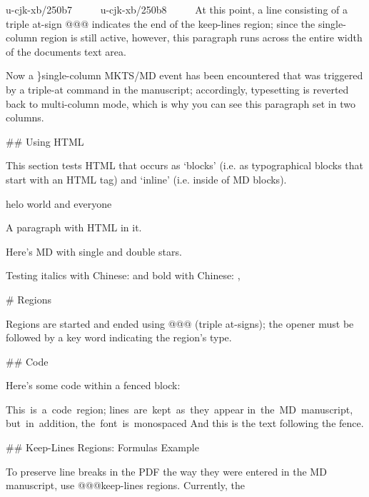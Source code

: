 {\mktsStyleCode{}u-cjk-xb/250b7}     
{\mktsStyleCode{}u-cjk-xb/250b8}     
\endgroup{}At this point, a line consisting of a triple at-sign {\mktsStyleCode{}@@@}
indicates the end of the {\mktsStyleCode{}keep-lines} region; since the
{\mktsStyleCode{}single-column} region is still active, however, {\mktsStyleItalic{}this
paragraph runs across the entire width\/} of the documents text
area.
\begin{multicols}{2}Now a {\mktsStyleCode{}\}single-column} {\mktsStyleBold{}MKTS}/MD event has been encountered
that was triggered by a triple-at command in the manuscript;
accordingly, typesetting is reverted back to multi-column mode,
which is why you can see this paragraph set in two columns.\mktsShowpar\par
\#\# Using HTML\mktsShowpar\par
This section tests HTML that occurs as ‘blocks’ (i.e. as typographical blocks
that start with an HTML tag) and ‘inline’ (i.e. inside of MD blocks).\mktsShowpar\par
helo {\mktsStyleItalic{}world\/} and {\mktsStyleBold{}everyone}\mktsShowpar\par
A paragraph with {\/} HTML in it.\mktsShowpar\par
Here’s MD with {\mktsStyleItalic{}single\/} and {\mktsStyleBold{}double} stars.\mktsShowpar\par
Testing {\mktsStyleItalic{}italics with Chinese: \/} and {\mktsStyleBold{}bold with Chinese: , }\mktsShowpar\par
\# Regions\mktsShowpar\par
Regions are started and ended using {\mktsStyleCode{}@@@} (triple at-signs); the opener
must be followed by a key word indicating the region’s type.\mktsShowpar\par
\#\# Code\mktsShowpar\par
Here’s {\mktsStyleCode{}some code} within a fenced block:\mktsShowpar\par
\begingroup\obeyalllines\mktsStyleCode{}This is a code region;
lines are kept as they appear
in the MD manuscript,
but in addition,
the font is monospaced
\endgroup{}And this is the text following the fence.\mktsShowpar\par
\#\# Keep-Lines Regions: Formulas Example\mktsShowpar\par
To preserve line breaks in the PDF the way they were entered in
the MD manuscript, use {\mktsStyleCode{}@@@keep-lines} regions. Currently, the

\end{multicols}
